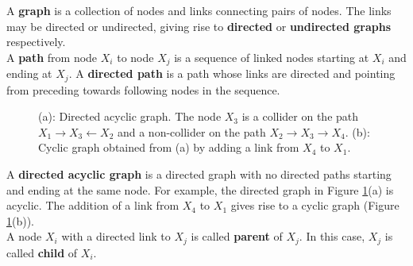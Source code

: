 A {\bf graph} is a collection of nodes and links connecting pairs of nodes.
The links may be directed or undirected, giving rise to {\bf directed} or {\bf undirected graphs} respectively.\\[5pt]
A {\bf path} from node $X_i$ to node $X_j$ is a sequence of linked nodes starting
at $X_i$ and ending at $X_j$. A {\bf directed path} is a path whose links are directed and pointing from preceding towards following nodes in the sequence.\\[5pt]

\begin{figure}
\centering
{}
\hskip0.2cm
\caption{(a): Directed acyclic graph. The node $X_3$ is a collider on the path $X_1 \rightarrow X_3 \leftarrow X_2$ and a non-collider on the path $X_2\rightarrow X_3\rightarrow X_4$. (b): Cyclic graph obtained from (a) by adding a link from $X_4$ to $X_1$.}
\label{fig:indep_HMM}
\vspace{-0.75cm}
\end{figure}A {\bf directed acyclic graph} is a directed graph with no
directed paths starting and ending at the same node. For example, the directed graph in Figure \ref{fig:indep_HMM}(a) is acyclic. 
The addition of a link from $X_4$ to $X_1$ gives rise to a cyclic graph (Figure \ref{fig:indep_HMM}(b)).\\[5pt]
A node $X_i$ with a directed link to $X_j$ is called {\bf parent}
of $X_j$. In this case, $X_j$ is called {\bf child} of $X_i$.\\[5pt]
